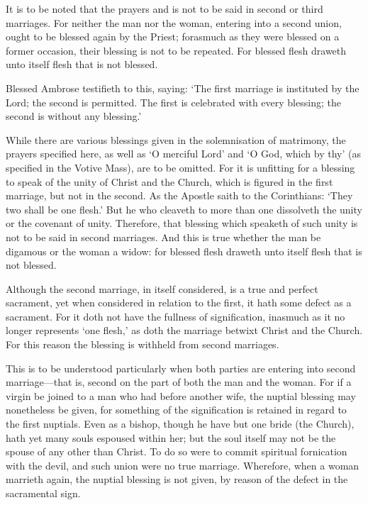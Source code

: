\begin{rubric}
	It is to be noted that the prayers  and  is not to be said in second or third marriages. For neither the man nor the woman, entering into a second union, ought to be blessed again by the Priest; forasmuch as they were blessed on a former occasion, their blessing is not to be repeated. For blessed flesh draweth unto itself flesh that is not blessed.\par
	Blessed Ambrose testifieth to this, saying: `The first marriage is instituted by the Lord; the second is permitted. The first is celebrated with every blessing; the second is without any blessing.'
\end{rubric}
\begin{rubric}
	While there are various blessings given in the solemnisation of matrimony, the prayers specified here, as well as `O merciful Lord' and `O God, which by thy' (as specified in the Votive Mass), are to be omitted. For it is unfitting for a blessing to speak of the unity of Christ and the Church, which is figured in the first marriage, but not in the second. As the Apostle saith to the Corinthians: `They two shall be one flesh.' But he who cleaveth to more than one dissolveth the unity or the covenant of unity. Therefore, that blessing which speaketh of such unity is not to be said in second marriages. And this is true whether the man be digamous or the woman a widow: for blessed flesh draweth unto itself flesh that is not blessed.
\end{rubric}
\begin{rubric}
	Although the second marriage, in itself considered, is a true and perfect sacrament, yet when considered in relation to the first, it hath some defect as a sacrament. For it doth not have the fullness of signification, inasmuch as it no longer represents `one flesh,' as doth the marriage betwixt Christ and the Church. For this reason the blessing is withheld from second marriages.\par
	This is to be understood particularly when both parties are entering into second marriage---that is, second on the part of both the man and the woman. For if a virgin be joined to a man who had before another wife, the nuptial blessing may nonetheless be given, for something of the signification is retained in regard to the first nuptials. Even as a bishop, though he have but one bride (the Church), hath yet many souls espoused within her; but the soul itself may not be the spouse of any other than Christ. To do so were to commit spiritual fornication with the devil, and such union were no true marriage. Wherefore, when a woman marrieth again, the nuptial blessing is not given, by reason of the defect in the sacramental sign.
\end{rubric}

